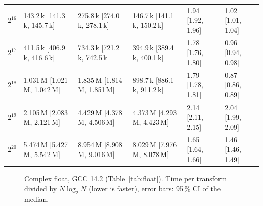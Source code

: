 \begin{table}[h]
\begin{tabular}{rlllll}
$2^{16}$ & 143.2\,k {\scriptsize[141.3\,k, 145.7\,k]} & 275.8\,k {\scriptsize[274.0\,k, 278.1\,k]} & 146.7\,k {\scriptsize[141.1\,k, 150.2\,k]} & 1.94 {\scriptsize[1.92, 1.96]} & 1.02 {\scriptsize[1.01, 1.04]}\\
$2^{17}$ & 411.5\,k {\scriptsize[406.9\,k, 416.6\,k]} & 734.3\,k {\scriptsize[721.2\,k, 742.5\,k]} & 394.9\,k {\scriptsize[389.4\,k, 400.1\,k]} & 1.78 {\scriptsize[1.76, 1.80]} & 0.96 {\scriptsize[0.94, 0.98]}\\
$2^{18}$ & 1.031\,M {\scriptsize[1.021\,M, 1.042\,M]} & 1.835\,M {\scriptsize[1.814\,M, 1.851\,M]} & 898.7\,k {\scriptsize[886.1\,k, 911.2\,k]} & 1.79 {\scriptsize[1.78, 1.81]} & 0.87 {\scriptsize[0.86, 0.89]}\\
$2^{19}$ & 2.105\,M {\scriptsize[2.083\,M, 2.121\,M]} & 4.429\,M {\scriptsize[4.378\,M, 4.506\,M]} & 4.373\,M {\scriptsize[4.293\,M, 4.423\,M]} & 2.14 {\scriptsize[2.11, 2.15]} & 2.04 {\scriptsize[1.99, 2.09]}\\
$2^{20}$ & 5.474\,M {\scriptsize[5.427\,M, 5.542\,M]} & 8.954\,M {\scriptsize[8.908\,M, 9.016\,M]} & 8.029\,M {\scriptsize[7.976\,M, 8.078\,M]} & 1.65 {\scriptsize[1.64, 1.66]} & 1.46 {\scriptsize[1.46, 1.49]}\\
\bottomrule\end{tabular}\end{table}

\begin{figure}[h]\centering{}\caption{Complex float, GCC 14.2 (Table~\ref{tab:float}). Time per transform divided by $N\log_2 N$ (lower is faster), error bars: 95\,\% CI of the median.}\label{fig:float}\end{figure}

